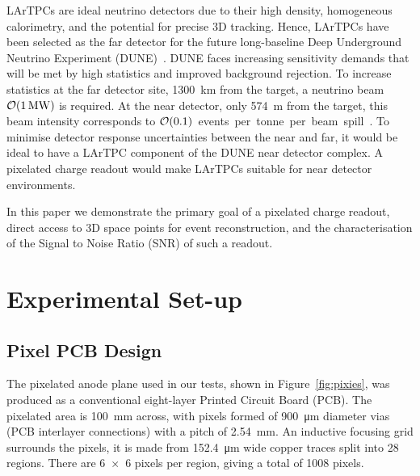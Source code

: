 \documentclass[instruments,article,submit,moreauthors,pdftex]{Definitions/mdpi}
\begin{document}
LArTPCs are ideal neutrino detectors due to their high density, homogeneous calorimetry, and the potential for precise 3D tracking.
Hence, LArTPCs have been selected as the far detector for the future long-baseline Deep Underground Neutrino Experiment (DUNE)~\cite{DUNE}.  
DUNE faces increasing sensitivity demands that will be met by high statistics and improved background rejection. 
To increase statistics at the far detector site, \SI{1300}{\kilo\metre} from the target, a neutrino beam $\order{\SI{1}{\mega\watt}}$ is required.
At the near detector, only \SI{574}{\metre} from the target, this beam intensity corresponds to $\order{0.1}$~events~per~tonne~per~beam~spill~\cite{DUNE2,DUNE3}.
To minimise detector response uncertainties between the near and far, it would be ideal to have a LArTPC component of the DUNE near detector complex.
A pixelated charge readout would make LArTPCs suitable for near detector environments.

In this paper we demonstrate the primary goal of a pixelated charge readout, direct access to 3D space points for event reconstruction, and the characterisation of the Signal to Noise Ratio (SNR) of such a readout. 

\section{Experimental Set-up}

\subsection{Pixel PCB Design} \label{sec:PCB}

The pixelated anode plane used in our tests, shown in Figure~\ref{fig:pixies}, was produced as a conventional eight-layer Printed Circuit Board (PCB). 
The pixelated area is \SI{100}{\milli\metre} across, with pixels formed of \SI{900}{\micro\metre} diameter vias (PCB interlayer connections) with a pitch of \SI{2.54}{\milli\metre}.
An inductive focusing grid surrounds the pixels, it is made from \SI{152.4}{\micro\metre} wide copper traces split into 28 regions.
There are \num{6 x 6} pixels per region, giving a total of 1008 pixels. 
\end{document}
